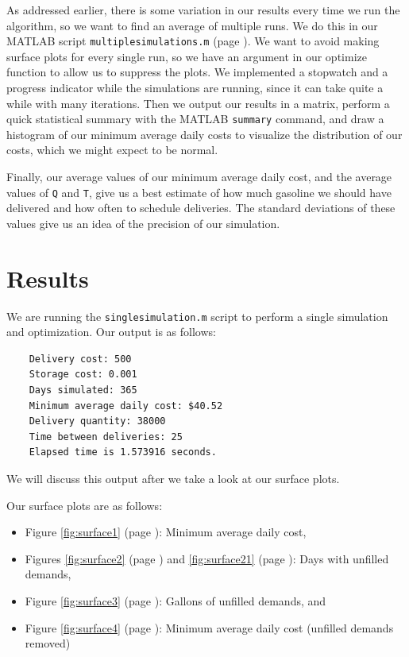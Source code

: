 \documentclass{article}
\begin{document}
    As addressed earlier, there is some variation in our results every time we run the algorithm, so we want to find an average of multiple runs. We do this in our MATLAB script \texttt{multiplesimulations.m} (page \pageref{code:multiplesimulations}). We want to avoid making surface plots for every single run, so we have an argument in our optimize function to allow us to suppress the plots.  We implemented a stopwatch and a progress indicator while the simulations are running, since it can take quite a while with many iterations. Then we output our results in a matrix, perform a quick statistical summary with the MATLAB \texttt{summary} command, and draw a histogram of our minimum average daily costs to visualize the distribution of our costs, which we might expect to be normal.

    Finally, our average values of our minimum average daily cost, and the average values of \texttt{Q} and \texttt{T}, give us a best estimate of how much gasoline we should have delivered and how often to schedule deliveries. The standard deviations of these values give us an idea of the precision of our simulation.
    \section*{Results}
    We are running the \texttt{singlesimulation.m} script to perform a single simulation and optimization. Our output is as follows:

    \begin{verbatim}
    Delivery cost: 500
    Storage cost: 0.001
    Days simulated: 365
    Minimum average daily cost: $40.52
    Delivery quantity: 38000
    Time between deliveries: 25
    Elapsed time is 1.573916 seconds.\end{verbatim}

    We will discuss this output after we take a look at our surface plots.

    Our surface plots are as follows:
    \begin{itemize}
        \item Figure \ref{fig:surface1} (page \pageref{fig:surface1}): Minimum average daily cost,
        \item Figures \ref{fig:surface2} (page \pageref{fig:surface2}) and \ref{fig:surface21} (page \pageref{fig:surface21}): Days with unfilled demands,
        \item Figure \ref{fig:surface3} (page \pageref{fig:surface3}): Gallons of unfilled demands, and
        \item Figure \ref{fig:surface4} (page \pageref{fig:surface4}): Minimum average daily cost (unfilled demands removed)
    \end{itemize}
\end{document}
